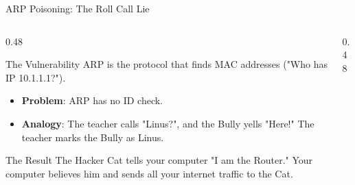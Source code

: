 \documentclass[aspectratio=169]{beamer}  %
\begin{document}
\begin{frame}{ARP Poisoning: The Roll Call Lie}
    \begin{columns}[T]
        \begin{column}{0.48\textwidth}
            \begin{block}{The Vulnerability}
                \footnotesize
                ARP is the protocol that finds MAC addresses ("Who has IP 10.1.1.1?").
                \begin{itemize}
                    \item \textbf{Problem}: ARP has no ID check.
                    \item \textbf{Analogy}: The teacher calls "Linus?", and the Bully yells "Here!" The teacher marks the Bully as Linus.
                \end{itemize}
            \end{block}
            \begin{alertblock}{The Result}
                \footnotesize
                The Hacker Cat tells your computer "I am the Router." Your computer believes him and sends all your internet traffic to the Cat.
            \end{alertblock}
        \end{column}
        \begin{column}{0.48\textwidth}
            \begin{center}
            \end{center}
        \end{column}
    \end{columns}
\end{frame}
\end{document}
